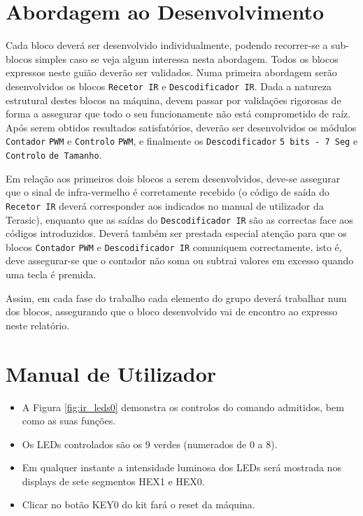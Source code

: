 \documentclass[a4paper,11pt,openright,oneside]{report}
\begin{document}
\section{Abordagem ao Desenvolvimento}

Cada bloco deverá ser desenvolvido individualmente, podendo recorrer-se a sub-blocos simples caso se veja algum interessa nesta abordagem. Todos os blocos expressos neste guião deverão ser validados. Numa primeira abordagem serão desenvolvidos os blocos \verb|Recetor IR| e \verb|Descodificador IR|. Dada a natureza estrutural destes blocos na máquina, devem passar por validações rigorosas de forma a assegurar que todo o seu funcionamente não está comprometido de raíz. Após serem obtidos resultados satisfatórios, deverão ser desenvolvidos os módulos \verb|Contador| \verb|PWM| e \verb|Controlo| \verb|PWM|, e finalmente os \verb|Descodificador| \verb|5 bits - 7 Seg| e \verb|Controlo| \verb|de Tamanho|.

Em relação aos primeiros dois blocos a serem desenvolvidos, deve-se assegurar que o sinal de infra-vermelho é corretamente recebido (o código de saída do \verb|Recetor IR| deverá corresponder aos indicados no manual de utilizador da Terasic), enquanto que as saídas do \verb|Descodificador IR| são as correctas face aos códigos introduzidos. Deverá também ser prestada especial atenção para que os blocos \verb|Contador| \verb|PWM| e \verb|Descodificador IR| comuniquem correctamente, isto é, deve assegurar-se que o contador não soma ou subtrai valores em excesso quando uma tecla é premida.

Assim, em cada fase do trabalho cada elemento do grupo deverá trabalhar num dos blocos, assegurando que o bloco desenvolvido vai de encontro ao expresso neste relatório.

\section{Manual de Utilizador}

\begin{itemize}
\item A Figura \ref{fig:ir_leds0} demonstra os controlos do comando admitidos, bem como as suas funções.
\item Os LEDs controlados são os 9 verdes (numerados de 0 a 8).
\item Em qualquer instante a intensidade luminosa dos LEDs será mostrada nos displays de sete segmentos HEX1 e HEX0.
\item Clicar no botão KEY0 do kit fará o reset da máquina.
\end{itemize}

\maketitle
\nocite{*}
\printbibliography[title={Referências}]
\end{document}
